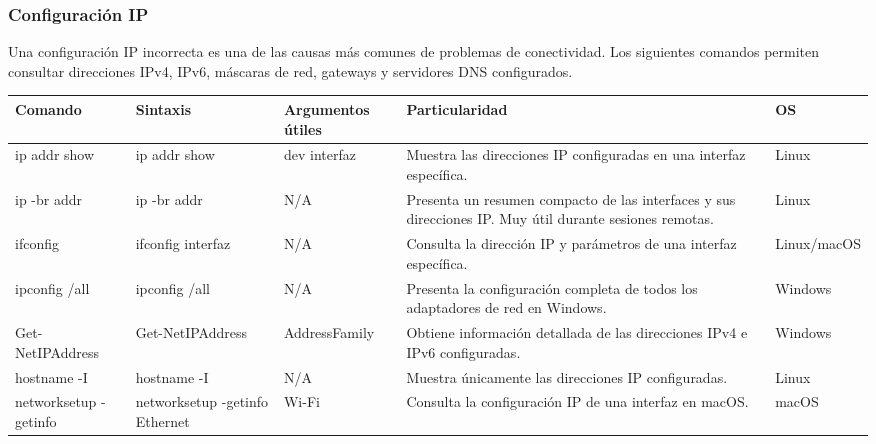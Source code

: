 \documentclass[a4paper,10pt]{article}
\begin{document}

\subsubsection{Configuración IP}

Una configuración IP incorrecta es una de las causas más comunes de problemas de
conectividad. Los siguientes comandos permiten consultar direcciones IPv4,
IPv6, máscaras de red, gateways y servidores DNS configurados.

\begin{longtable}{|p{2.8cm}|p{3cm}|p{4cm}|p{5.6cm}|p{1.5cm}|}

\hline
Comando &
Sintaxis &
Argumentos útiles &
Particularidad &
OS
\\
\hline
\endhead

ip addr show &
ip addr show &
dev interfaz &
Muestra las direcciones IP configuradas en una interfaz específica. &
Linux
\\
\hline

ip -br addr &
ip -br addr &
N/A &
Presenta un resumen compacto de las interfaces y sus direcciones IP. Muy útil durante sesiones remotas. &
Linux
\\
\hline

ifconfig &
ifconfig interfaz &
N/A &
Consulta la dirección IP y parámetros de una interfaz específica. &
Linux/macOS
\\
\hline

ipconfig /all &
ipconfig /all &
N/A &
Presenta la configuración completa de todos los adaptadores de red en Windows. &
Windows
\\
\hline

Get-NetIPAddress &
Get-NetIPAddress &
AddressFamily &
Obtiene información detallada de las direcciones IPv4 e IPv6 configuradas. &
Windows
\\
\hline

hostname -I &
hostname -I &
N/A &
Muestra únicamente las direcciones IP configuradas. &
Linux
\\
\hline

networksetup -getinfo &
networksetup -getinfo Ethernet &
Wi-Fi &
Consulta la configuración IP de una interfaz en macOS. &
macOS
\\
\hline


\end{longtable}

\end{document}
